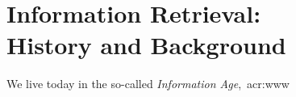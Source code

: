
\chapter[Information Retrieval]{Information Retrieval:\\History and Background}\label{chap:ir}
We live today in the so-called \emph{Information Age},~\gls{acr:www}